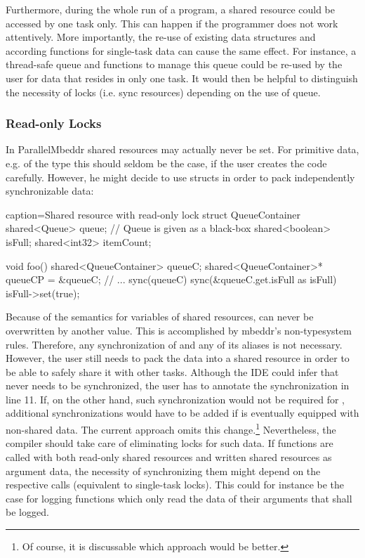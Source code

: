 Furthermore, during the whole run of a program, a shared resource could be accessed by one task only. This can happen if the programmer does not work attentively. More importantly, the re-use of existing data structures and according functions for single-task data can cause the same effect. For instance, a thread-safe queue and functions to manage this queue could be re-used by the user for data that resides in only one task. It would then be helpful to distinguish the necessity of locks (i.e. sync resources) depending on the use of queue.

\subsubsection{Read-only Locks}
In ParallelMbeddr shared resources may actually never be set. For primitive data, e.g. of the type  this should seldom be the case, if the user creates the code carefully. However, he might decide to use structs in order to pack independently synchronizable data:
\begin{ccode}{caption=Shared resource with read-only lock}
struct QueueContainer {
  shared<Queue>   queue;     // Queue is given as a black-box
  shared<boolean> isFull;
  shared<int32>   itemCount;
}

void foo() {
  shared<QueueContainer> queueC;
  shared<QueueContainer>* queueCP = &queueC;
  // ...
  sync(queueC) {
    sync(&queueC.get.isFull as isFull) {
      isFull->set(true);
    }
  }
}
\end{ccode}
Because of the semantics for variables of shared resources,  can never be overwritten by another value. This is accomplished by mbeddr's non-typesystem rules. Therefore, any synchronization of  and any of its aliases is not necessary. However, the user still needs to pack the data into a shared resource in order to be able to safely share it with other tasks. Although the IDE could infer that  never needs to be synchronized, the user has to annotate the synchronization in line 11. If, on the other hand, such synchronization would not be required for , additional synchronizations would have to be added if  is eventually equipped with non-shared data. The current approach omits this change.\footnote{Of course, it is discussable which approach would be better.} Nevertheless, the compiler should take care of eliminating locks for such data. If functions are called with both read-only shared resources and written shared resources as argument data, the necessity of synchronizing them might depend on the respective calls (equivalent to single-task locks). This could for instance be the case for logging functions which only read the data of their arguments that shall be logged.

